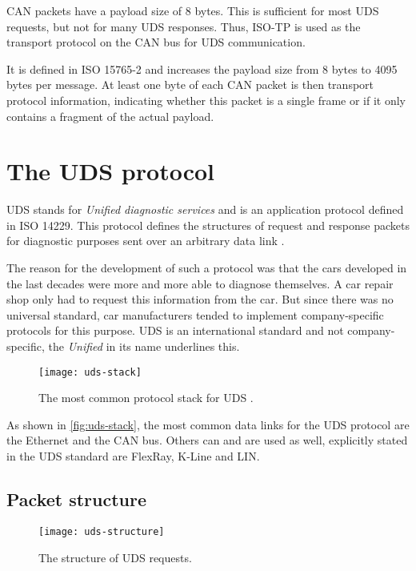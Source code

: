 CAN packets have a payload size of 8 bytes. This is sufficient for most UDS requests, but not for many UDS responses. Thus, ISO-TP is used as the transport protocol on the CAN bus for UDS communication.

It is defined in ISO 15765-2 and increases the payload size from 8 bytes to 4095 bytes per message. At least one byte of each CAN packet is then transport protocol information, indicating whether this packet is a single frame or if it only contains a fragment of the actual payload.

\section{The UDS protocol}

UDS stands for \emph{Unified diagnostic services} and is an application protocol defined in ISO 14229. This protocol defines the structures of request and response packets for diagnostic purposes sent over an arbitrary data link \cite{iso14229}.

The reason for the development of such a protocol was that the cars developed in the last decades were more and more able to diagnose themselves. A car repair shop only had to request this information from the car. But since there was no universal standard, car manufacturers tended to implement company-specific protocols for this purpose. UDS is an international standard and not company-specific, the \emph{Unified} in its name underlines this. 

\begin{figure}[htb]
    \centering
    \texttt{[image: uds-stack]}
    \caption{The most common protocol stack for UDS \cite{Weiss2020}.}
    \label{fig:uds-stack}
\end{figure}

As shown in \autoref{fig:uds-stack}, the most common data links for the UDS protocol are the Ethernet and the CAN bus. Others can and are used as well, explicitly stated in the UDS standard are FlexRay, K-Line and LIN.

\subsection{Packet structure}

\begin{figure}[htb]
    \centering
    \texttt{[image: uds-structure]}
    \caption{The structure of UDS requests.}
    \label{fig:uds-structure}
\end{figure}

